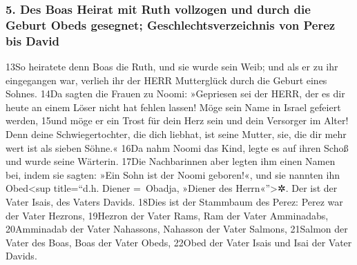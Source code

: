 \hypertarget{des-boas-heirat-mit-ruth-vollzogen-und-durch-die-geburt-obeds-gesegnet-geschlechtsverzeichnis-von-perez-bis-david}{%
\subsubsection{5. Des Boas Heirat mit Ruth vollzogen und durch die
Geburt Obeds gesegnet; Geschlechtsverzeichnis von Perez bis
David}\label{des-boas-heirat-mit-ruth-vollzogen-und-durch-die-geburt-obeds-gesegnet-geschlechtsverzeichnis-von-perez-bis-david}}

13So heiratete denn Boas die Ruth, und sie wurde sein Weib; und als er
zu ihr eingegangen war, verlieh ihr der HERR Mutterglück durch die
Geburt eines Sohnes. 14Da sagten die Frauen zu Noomi: »Gepriesen sei der
HERR, der es dir heute an einem Löser nicht hat fehlen lassen! Möge sein
Name in Israel gefeiert werden, 15und möge er ein Trost für dein Herz
sein und dein Versorger im Alter! Denn deine Schwiegertochter, die dich
liebhat, ist seine Mutter, sie, die dir mehr wert ist als sieben Söhne.«
16Da nahm Noomi das Kind, legte es auf ihren Schoß und wurde seine
Wärterin. 17Die Nachbarinnen aber legten ihm einen Namen bei, indem sie
sagten: »Ein Sohn ist der Noomi geboren!«, und sie nannten ihn
Obed\textless sup title=``d.h. Diener =~Obadja, »Diener des
Herrn«''\textgreater✲. Der ist der Vater Isais, des Vaters Davids.
18Dies ist der Stammbaum des Perez: Perez war der Vater Hezrons,
19Hezron der Vater Rams, Ram der Vater Amminadabs, 20Amminadab der Vater
Nahassons, Nahasson der Vater Salmons, 21Salmon der Vater des Boas, Boas
der Vater Obeds, 22Obed der Vater Isais und Isai der Vater Davids.
